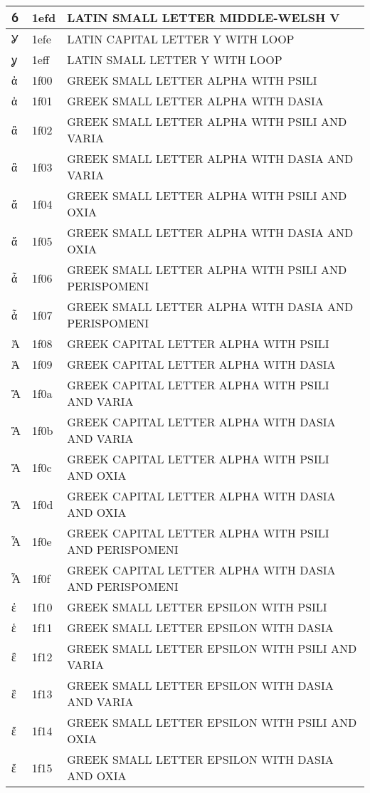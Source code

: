 \documentclass[12pt,letterpaper,openany]{book}
\begin{document}
\begin{center}
\begin{supertabular}{|m{0.25in}|m{0.5in}|m{4in}|}
			ỽ & 1efd & LATIN SMALL LETTER MIDDLE-WELSH V\\\hline
			Ỿ & 1efe & LATIN CAPITAL LETTER Y WITH LOOP\\\hline
			ỿ & 1eff & LATIN SMALL LETTER Y WITH LOOP\\\hline
			ἀ & 1f00 & GREEK SMALL LETTER ALPHA WITH PSILI\\\hline
			ἁ & 1f01 & GREEK SMALL LETTER ALPHA WITH DASIA\\\hline
			ἂ & 1f02 & GREEK SMALL LETTER ALPHA WITH PSILI AND VARIA\\\hline
			ἃ & 1f03 & GREEK SMALL LETTER ALPHA WITH DASIA AND VARIA\\\hline
			ἄ & 1f04 & GREEK SMALL LETTER ALPHA WITH PSILI AND OXIA\\\hline
			ἅ & 1f05 & GREEK SMALL LETTER ALPHA WITH DASIA AND OXIA\\\hline
			ἆ & 1f06 & GREEK SMALL LETTER ALPHA WITH PSILI AND PERISPOMENI\\\hline
			ἇ & 1f07 & GREEK SMALL LETTER ALPHA WITH DASIA AND PERISPOMENI\\\hline
			Ἀ & 1f08 & GREEK CAPITAL LETTER ALPHA WITH PSILI\\\hline
			Ἁ & 1f09 & GREEK CAPITAL LETTER ALPHA WITH DASIA\\\hline
			Ἂ & 1f0a & GREEK CAPITAL LETTER ALPHA WITH PSILI AND VARIA\\\hline
			Ἃ & 1f0b & GREEK CAPITAL LETTER ALPHA WITH DASIA AND VARIA\\\hline
			Ἄ & 1f0c & GREEK CAPITAL LETTER ALPHA WITH PSILI AND OXIA\\\hline
			Ἅ & 1f0d & GREEK CAPITAL LETTER ALPHA WITH DASIA AND OXIA\\\hline
			Ἆ & 1f0e & GREEK CAPITAL LETTER ALPHA WITH PSILI AND PERISPOMENI\\\hline
			Ἇ & 1f0f & GREEK CAPITAL LETTER ALPHA WITH DASIA AND PERISPOMENI\\\hline
			ἐ & 1f10 & GREEK SMALL LETTER EPSILON WITH PSILI\\\hline
			ἑ & 1f11 & GREEK SMALL LETTER EPSILON WITH DASIA\\\hline
			ἒ & 1f12 & GREEK SMALL LETTER EPSILON WITH PSILI AND VARIA\\\hline
			ἓ & 1f13 & GREEK SMALL LETTER EPSILON WITH DASIA AND VARIA\\\hline
			ἔ & 1f14 & GREEK SMALL LETTER EPSILON WITH PSILI AND OXIA\\\hline
			ἕ & 1f15 & GREEK SMALL LETTER EPSILON WITH DASIA AND OXIA\\\hline

\end{supertabular}
\end{center}
\end{document}
